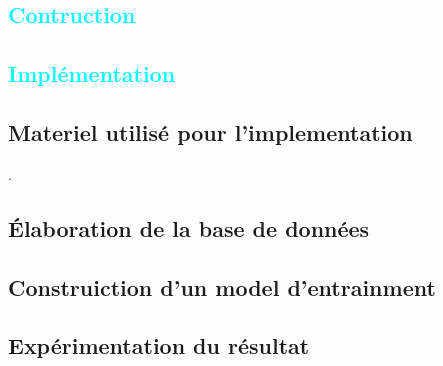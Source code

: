 
\textcolor{cyan}{\chapter{Contruction }}

\textcolor{cyan}{\chapter{Implémentation }}

	\section{Materiel utilisé pour l'implementation}
	\lipsum[1].
	\section{Élaboration de la base de données}
	\lipsum[1]
	
	\section{Construiction d'un model d'entrainment}
	\lipsum[1]
	\section{Expérimentation du résultat}
	\lipsum[1] 
	\\
	\lipsum[1]


